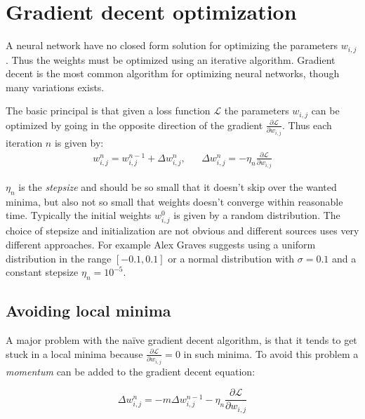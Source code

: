 
\section{Gradient decent optimization}

A neural network have no closed form solution for optimizing the parameters $w_{i,j}$. Thus the weights must be optimized using an iterative algorithm. Gradient decent is the most common algorithm for optimizing neural networks, though many variations exists.

The basic principal is that given a loss function $\mathcal{L}$ the parameters $w_{i,j}$ can be optimized by going in the opposite direction of the gradient $\frac{\partial \mathcal{L}}{\partial w_{i,j}}$. Thus each iteration $n$ is given by:
\begin{equation}
\begin{aligned}
w_{i,j}^n = w_{i,j}^{n-1} + \Delta w_{i,j}^n, && \Delta w_{i,j}^n = - \eta_n \frac{\partial \mathcal{L}}{\partial w_{i,j}}
\end{aligned}
\end{equation}

$\eta_n$ is the \textit{stepsize} and should be so small that it doesn't skip over the wanted minima, but also not so small that weights doesn't converge within reasonable time. Typically the initial weights $w^0_{i,j}$ is given by a random distribution. The choice of stepsize and initialization are not obvious and different sources uses very different approaches. For example Alex Graves \cite{alexgraves} suggests using a uniform distribution in the range $[-0.1, 0.1]$ or a normal distribution with $\sigma = 0.1$ and a constant stepsize $\eta_n = 10^{-5}$.

\subsection{Avoiding local minima}

A major problem with the naïve gradient decent algorithm, is that it tends to get stuck in a local minima because $\frac{\partial \mathcal{L}}{\partial w_{i,j}} = 0$ in such minima. To avoid this problem a \textit{momentum} can be added to the gradient decent equation:

\begin{equation}
\Delta w_{i,j}^n = - m \Delta w_{i,j}^{n-1} - \eta_n \frac{\partial \mathcal{L}}{\partial w_{i,j}}
\end{equation}

